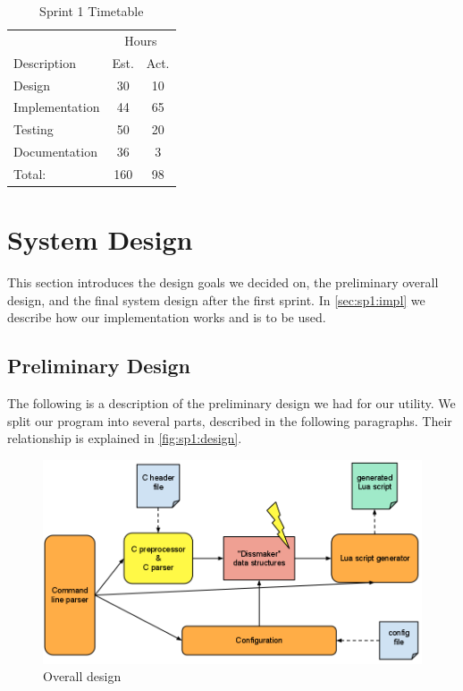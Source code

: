 \begin{table}[!ht] \small \center
\caption{Sprint 1 Timetable\label{tab:sprint1time}}
\begin{tabularx}{\textwidth}{X c c}
	\toprule
	& \multicolumn{2}{c}{Hours} \\
	\cmidrule(r){2-3}
	Description & Est. & Act. \\
	\midrule
	Design & 30 & 10\\
	\addlinespace
	Implementation & 44 & 65 \\
	\addlinespace
	Testing & 50 & 20\\
	\addlinespace
	Documentation & 36 & 3\\
	\midrule
	Total: & 160 & 98 \\
	\bottomrule
\end{tabularx}
\end{table}

\section{System Design}
\label{sec:sp1:design}
This section introduces the design goals we decided on, the preliminary overall
design, and the final system design after the first sprint. In
\autoref{sec:sp1:impl} we describe how our implementation works and is to be
used.

\subsection{Preliminary Design}
The following is a description of the preliminary design we had for our
\gls{utility}. We split our program into several parts, described in the
following paragraphs. Their relationship is explained in
\autoref{fig:sp1:design}.

\begin{figure}[!htb]
	\center
	\includegraphics[width=\textwidth]{./sprints/img/design}
	\caption{Overall design\label{fig:sp1:design}}
\end{figure}

